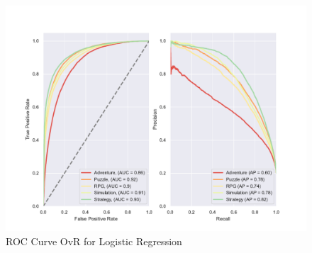\begin{figure}[t]
    \centering
    \includegraphics[width=\textwidth]{data/results/plots/logistic_regression_roc}
    \caption{ROC Curve OvR for Logistic Regression}
    \label{fig:log_reg_roc}
\end{figure}